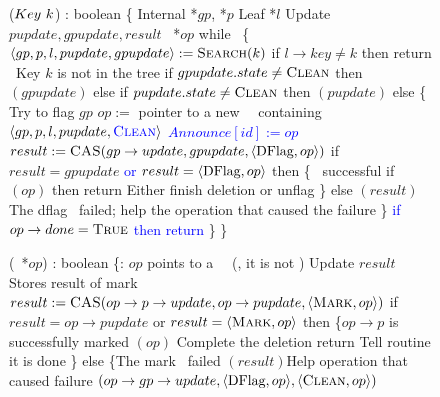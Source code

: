 \begin{figure*}
	\scriptsize
	\begin{code}
		\firstline
		($Key\ k$) : boolean \{\nlc
		\n Internal *$gp$, *$p$\nlc
		Leaf *$l$\nlc
		Update $pupdate, gpupdate, result$\nlc
		\DFlag\ *$op$\bl\nlc
		while \TRUE\ \{ \nlc
		\n     $\langle gp, p, l, pupdate, gpupdate \rangle := \mbox{\sc Search}(k)$\label{del-search}\nlc
		if $l\rightarrow key \neq k$ then return \FALSE\ \tabtabcom Key $k$ is not in the tree\label{delete-false}\nlc
		if $gpupdate.state \neq \mbox{\sc Clean}$ then $(gpupdate)$ \label{del-help-unclean-1}\nlc
		else if $pupdate.state \neq \mbox{\sc Clean}$ then $(pupdate)$\label{del-help-unclean-2}\nlc
		else \{ \tabtabcom Try to flag $gp$\nlc
		\n          $op :=$ pointer to a new \DFlag\ \record\  containing $\langle gp, p, l, pupdate, \textcolor{blue}{\mbox{\sc Clean}} \rangle$\label{new-DFlag}\nlc
		\textcolor{blue}{$Announce[id] := op$} \nlc
		$result := \mbox{\sc CAS}(gp\rightarrow update, gpupdate, \langle \mbox{DFlag}, op \rangle)$ \label{dflag-cas}\nlc
		if $result = gpupdate$ \textcolor{blue}{ or $result = \langle \mbox{DFlag}, op \rangle$} then \{ \tabtabcom \CASB\ successful \nlc
		\n             if $(op)$ then return \TRUE \label{delete-true} \tabtabcom Either finish deletion or unflag\nlc
		\p          \}\nlc                 
		else $(result)$ \tabcom The dflag \CASB\ failed; help the operation that caused the failure \label{del-help-after-failure}\nlc%
		\p     \}\nlc
		\textcolor{blue}{if $op \rightarrow done = \mbox{\sc True}$ then} \nlc
		\n		\textcolor{blue}{return \TRUE} \nlc \p
		\p \}\nlc
		\p
		\}\bl
		\nlc
		
		(\DFlag\ *$op$) : boolean \{\ul
		\n   {}:  $op$ points to a \DFlag\ \record\  (\ie, it is not \NULL)\nlc%
		Update $result$ \tabtabcom Stores result of mark \CASB\bl\nlc
		$result := \mbox{\sc CAS}(op\rightarrow p\rightarrow update, op\rightarrow pupdate, \langle \mbox{\sc Mark}, op\rangle)$ \label{mark-cas}\nlc     
		if $result = op\rightarrow pupdate$ or $result = \langle \mbox{\sc Mark}, op\rangle$ then \label{checkmark}\{\tabtabcom $op\rightarrow p$ is successfully marked\nlc
		\n          {}$(op)$ \label{call-hm1} \tabtabcom Complete the deletion\nlc
		return \TRUE\tabtabcom Tell  routine it is done\nlc
		\p       \}\nlc
		else \{\tabtabcom The mark \CASB\ failed \nlc
		\n              
		$(result)$\label{help-after-failed-mark}\tabtabcom Help operation that caused failure\nlc
		\CASB$(op\rightarrow gp\rightarrow update, \langle \mbox{DFlag}, op\rangle, \langle \mbox{\sc Clean}, op\rangle)$ \label{backtrack-cas}\nlc
		

\end{code}
\end{figure*}
